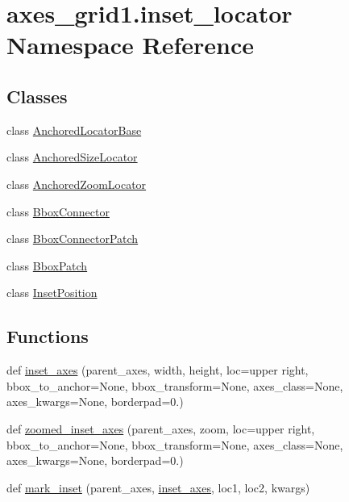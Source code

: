 \hypertarget{namespaceaxes__grid1_1_1inset__locator}{}\section{axes\+\_\+grid1.\+inset\+\_\+locator Namespace Reference}
\label{namespaceaxes__grid1_1_1inset__locator}
\subsection*{Classes}
\begin{DoxyCompactItemize}
\item 
class \hyperlink{classaxes__grid1_1_1inset__locator_1_1AnchoredLocatorBase}{Anchored\+Locator\+Base}
\item 
class \hyperlink{classaxes__grid1_1_1inset__locator_1_1AnchoredSizeLocator}{Anchored\+Size\+Locator}
\item 
class \hyperlink{classaxes__grid1_1_1inset__locator_1_1AnchoredZoomLocator}{Anchored\+Zoom\+Locator}
\item 
class \hyperlink{classaxes__grid1_1_1inset__locator_1_1BboxConnector}{Bbox\+Connector}
\item 
class \hyperlink{classaxes__grid1_1_1inset__locator_1_1BboxConnectorPatch}{Bbox\+Connector\+Patch}
\item 
class \hyperlink{classaxes__grid1_1_1inset__locator_1_1BboxPatch}{Bbox\+Patch}
\item 
class \hyperlink{classaxes__grid1_1_1inset__locator_1_1InsetPosition}{Inset\+Position}
\end{DoxyCompactItemize}
\subsection*{Functions}
\begin{DoxyCompactItemize}
\item 
def \hyperlink{namespaceaxes__grid1_1_1inset__locator_ace6e193a4a68fc92ef9c7af974fe0eb8}{inset\+\_\+axes} (parent\+\_\+axes, width, height, loc=\textquotesingle{}upper right\textquotesingle{}, bbox\+\_\+to\+\_\+anchor=None, bbox\+\_\+transform=None, axes\+\_\+class=None, axes\+\_\+kwargs=None, borderpad=0.)
\item 
def \hyperlink{namespaceaxes__grid1_1_1inset__locator_a30063c30f45a1a58e790506525aa97e3}{zoomed\+\_\+inset\+\_\+axes} (parent\+\_\+axes, zoom, loc=\textquotesingle{}upper right\textquotesingle{}, bbox\+\_\+to\+\_\+anchor=None, bbox\+\_\+transform=None, axes\+\_\+class=None, axes\+\_\+kwargs=None, borderpad=0.)
\item 
def \hyperlink{namespaceaxes__grid1_1_1inset__locator_af5107a77789279613392d10ab773b2c4}{mark\+\_\+inset} (parent\+\_\+axes, \hyperlink{namespaceaxes__grid1_1_1inset__locator_ace6e193a4a68fc92ef9c7af974fe0eb8}{inset\+\_\+axes}, loc1, loc2, kwargs)
\end{DoxyCompactItemize}


